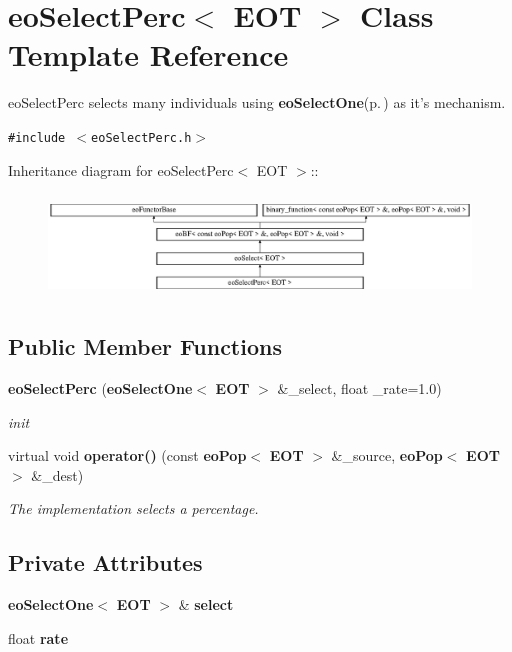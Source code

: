 \section{eo\-Select\-Perc$<$ EOT $>$ Class Template Reference}
\label{classeo_select_perc}
eo\-Select\-Perc selects many individuals using {\bf eo\-Select\-One}{\rm (p.\,\pageref{classeo_select_one})} as it's mechanism.  


{\tt \#include $<$eo\-Select\-Perc.h$>$}

Inheritance diagram for eo\-Select\-Perc$<$ EOT $>$::\begin{figure}[H]
\begin{center}
\leavevmode
\includegraphics[height=2.75184cm]{classeo_select_perc}
\end{center}
\end{figure}
\subsection*{Public Member Functions}
\begin{CompactItemize}
\item 
{\bf eo\-Select\-Perc} ({\bf eo\-Select\-One}$<$ {\bf EOT} $>$ \&\_\-select, float \_\-rate=1.0)\label{classeo_select_perc_a0}

\begin{CompactList}\small\item\em init \item\end{CompactList}\item 
virtual void {\bf operator()} (const {\bf eo\-Pop}$<$ {\bf EOT} $>$ \&\_\-source, {\bf eo\-Pop}$<$ {\bf EOT} $>$ \&\_\-dest)
\begin{CompactList}\small\item\em The implementation selects a percentage. \item\end{CompactList}\end{CompactItemize}
\subsection*{Private Attributes}
\begin{CompactItemize}
\item 
{\bf eo\-Select\-One}$<$ {\bf EOT} $>$ \& {\bf select}\label{classeo_select_perc_r0}

\item 
float {\bf rate}\label{classeo_select_perc_r1}

\end{CompactItemize}


